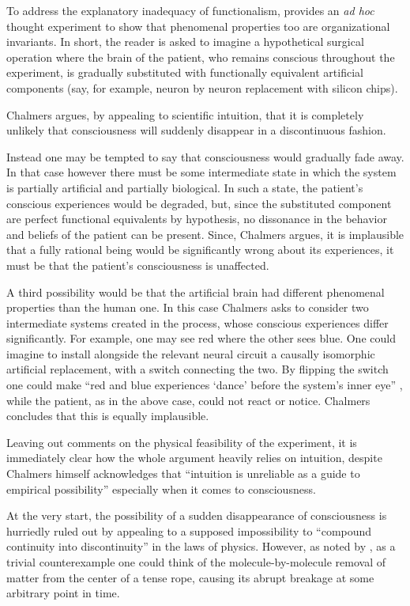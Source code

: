 \documentclass{article}
\begin{document}
To address the explanatory inadequacy of functionalism, \cite{chalmers1995absent} provides an \emph{ad hoc} thought experiment to show that phenomenal properties too are organizational invariants. In short, the reader is asked to imagine a hypothetical surgical operation where the brain of the patient, who remains conscious throughout the experiment, is gradually substituted with functionally equivalent artificial components (say, for example, neuron by neuron replacement with silicon chips).

Chalmers argues, by appealing to scientific intuition, that it is completely unlikely that consciousness will suddenly disappear in a discontinuous fashion.

Instead one may be tempted to say that consciousness would gradually fade away. In that case however there must be some intermediate state in which the system is partially artificial and partially biological. In such a state, the patient's conscious experiences would be degraded, but, since the substituted component are perfect functional equivalents by hypothesis, no dissonance in the behavior and beliefs of the patient can be present. Since, Chalmers argues, it is implausible that a fully rational being would be significantly wrong about its experiences, it must be that the patient's consciousness is unaffected.

A third possibility would be that the artificial brain had different phenomenal properties than the human one. In this case Chalmers asks to consider two intermediate systems created in the process, whose conscious experiences differ significantly. For example, one may see red where the other sees blue. One could imagine to install alongside the relevant neural circuit a causally isomorphic artificial replacement, with a switch connecting the two. By flipping the switch one could make ``red and blue experiences `dance' before the system's inner eye'' \cite[3.2]{chalmers2011computational}, while the patient, as in the above case, could not react or notice.  Chalmers concludes that this is equally implausible.

Leaving out comments on the physical feasibility of the experiment, it is immediately clear how the whole argument heavily relies on intuition, despite Chalmers himself acknowledges that ``intuition is unreliable as a guide to empirical possibility'' \citep[2.]{chalmers1995absent} especially when it comes to consciousness.

At the very start, the possibility of a sudden disappearance of consciousness is hurriedly ruled out by appealing to a supposed impossibility to ``compound continuity into discontinuity'' in the laws of physics. However, as noted by \cite{aidesyet}, as a trivial counterexample one could think of the molecule-by-molecule removal of matter from the center of a tense rope, causing its abrupt breakage at some arbitrary point in time.
\end{document}
